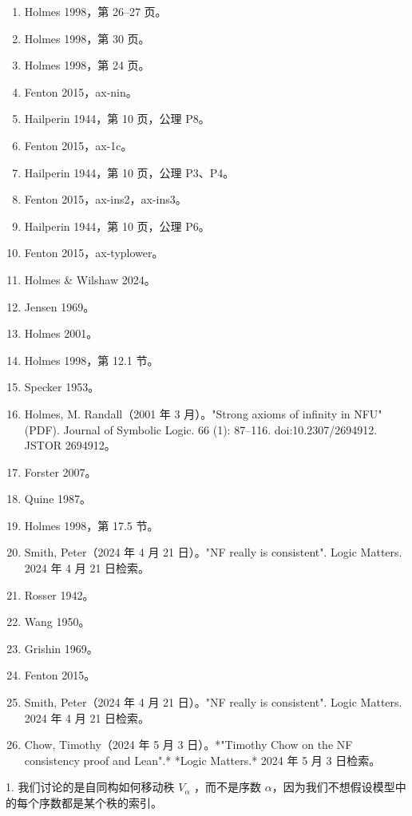 \begin{enumerate}
\item Holmes 1998，第 26–27 页。  
\item Holmes 1998，第 30 页。  
\item Holmes 1998，第 24 页。  
\item Fenton 2015，ax-nin。  
\item Hailperin 1944，第 10 页，公理 P8。  
\item Fenton 2015，ax-1c。  
\item Hailperin 1944，第 10 页，公理 P3、P4。  
\item Fenton 2015，ax-ins2，ax-ins3。  
\item Hailperin 1944，第 10 页，公理 P6。  
\item Fenton 2015，ax-typlower。  
\item Holmes & Wilshaw 2024。  
\item Jensen 1969。  
\item Holmes 2001。  
\item Holmes 1998，第 12.1 节。  
\item Specker 1953。  
\item Holmes, M. Randall（2001 年 3 月）。"Strong axioms of infinity in NFU" (PDF). Journal of Symbolic Logic. 66 (1): 87–116. doi:10.2307/2694912. JSTOR 2694912。  
\item Forster 2007。  
\item Quine 1987。  
\item Holmes 1998，第 17.5 节。  
\item Smith, Peter（2024 年 4 月 21 日）。"NF really is consistent". Logic Matters. 2024 年 4 月 21 日检索。  
\item Rosser 1942。  
\item Wang 1950。  
\item Grishin 1969。  
\item Fenton 2015。  
\item Smith, Peter（2024 年 4 月 21 日）。"NF really is consistent". Logic Matters. 2024 年 4 月 21 日检索。  
\item Chow, Timothy（2024 年 5 月 3 日）。*"Timothy Chow on the NF consistency proof and Lean".* *Logic Matters.* 2024 年 5 月 3 日检索。
\end{enumerate}
1. 我们讨论的是自同构如何移动秩 \( V_{\alpha} \) ，而不是序数 \( \alpha \)，因为我们不想假设模型中的每个序数都是某个秩的索引。
